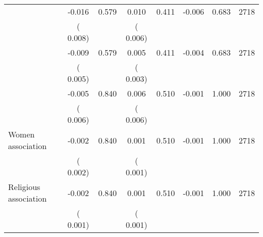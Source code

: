 \begin{tabular}{l*{7}{c}}
        &             -0.016       &        0.579  &              0.010       &        0.411  &             -0.006       &              0.683 &  2718 \\ 
                       &       (       0.008)             &                               &       (       0.006)                     &                               &                                               &                                &                      \\ 

        &             -0.009       &        0.579  &              0.005       &        0.411  &             -0.004       &              0.683 &  2718 \\ 
                       &       (       0.005)             &                               &       (       0.003)                     &                               &                                               &                                &                      \\ 

        &             -0.005       &        0.840  &              0.006       &        0.510  &             -0.001       &              1.000 &  2718 \\ 
                       &       (       0.006)             &                               &       (       0.006)                     &                               &                                               &                                &                      \\ 

 Women association       &             -0.002       &        0.840  &              0.001       &        0.510  &             -0.001       &              1.000 &  2718 \\ 
                       &       (       0.002)             &                               &       (       0.001)                     &                               &                                               &                                &                      \\ 

 Religious association       &             -0.002       &        0.840  &              0.001       &        0.510  &             -0.001       &              1.000 &  2718 \\ 
                       &       (       0.001)             &                               &       (       0.001)                     &                               &                                               &                                &                      \\ 


\end{tabular}
